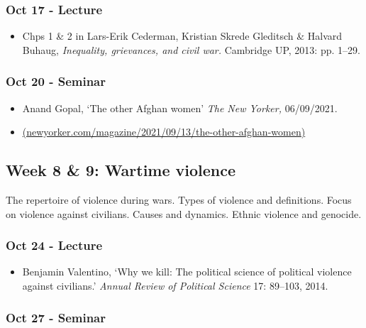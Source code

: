 \documentclass[12pt, a4paper]{article}
\begin{document}
\subsubsection*{Oct 17 - Lecture}

\begin{itemize}
\setlength\itemsep{0pt}
\item Chps 1 \& 2 in Lars-Erik Cederman, Kristian Skrede Gleditsch \& Halvard Buhaug, \textit{Inequality, grievances, and civil war.} Cambridge UP, 2013: pp. 1--29.
\end{itemize}

\subsubsection*{Oct 20 - Seminar}

\begin{itemize}
\setlength\itemsep{0pt}
\item Anand Gopal, `The other Afghan women' \textit{The New Yorker,} 06/09/2021.
\item[] \href{https://www.newyorker.com/magazine/2021/09/13/the-other-afghan-women}{(newyorker.com/magazine/2021/09/13/the-other-afghan-women)}
\end{itemize}

\hline %

\subsection*{Week 8 \& 9: Wartime violence}

The repertoire of violence during wars. Types of violence and definitions. Focus on violence against civilians. Causes and dynamics. Ethnic violence and genocide.

\subsubsection*{Oct 24 - Lecture}

\begin{itemize}
\setlength\itemsep{0pt}
\item Benjamin Valentino, `Why we kill: The political science of political violence against civilians.' \textit{Annual Review of Political Science} 17: 89--103, 2014.
\end{itemize}


\subsubsection*{Oct 27 - Seminar}
\end{document}
